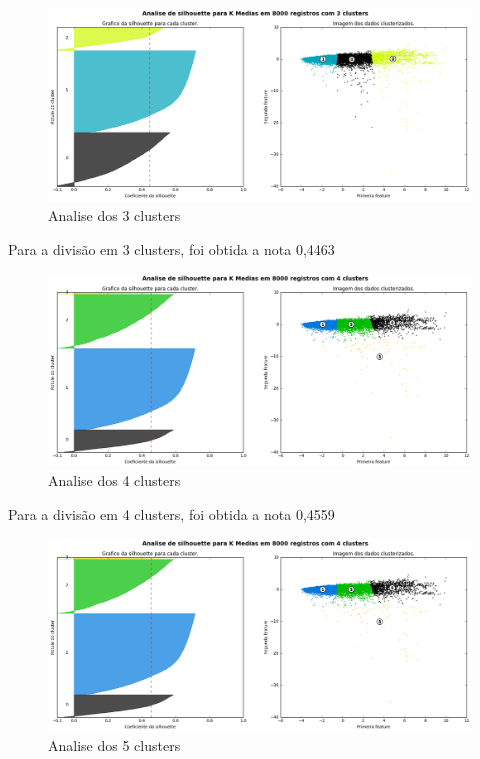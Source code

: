 \begin{figure}[!ht]
\caption{Analise dos 3 clusters }
\centerline{\includegraphics[width=1\textwidth]{img/silhoute3}}
\end{figure}

Para a divisão em 3 clusters, foi obtida a nota 0,4463

\begin{figure}[!ht]
\caption{Analise dos 4 clusters }
\centerline{\includegraphics[width=1\textwidth]{img/silhoute4}}
\end{figure}

Para a divisão em 4 clusters, foi obtida a nota 0,4559

\begin{figure}[!ht]
\caption{Analise dos 5 clusters }
\centerline{\includegraphics[width=1\textwidth]{img/silhoute4}}
\end{figure}

